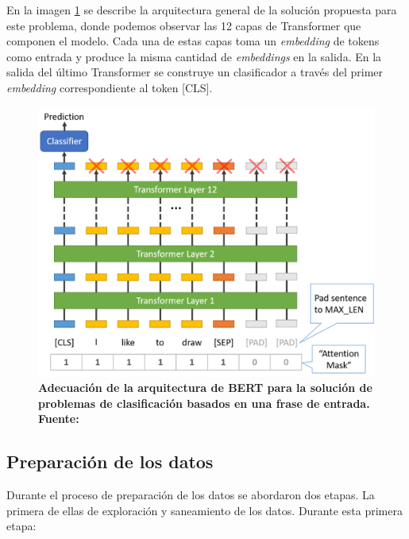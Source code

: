 En la imagen \ref{fig-bert-as-architecture} se describe la arquitectura general de la solución propuesta para este problema, donde podemos observar las 12 capas de Transformer que componen el modelo. Cada una de estas capas toma un \textit{embedding} de tokens como entrada y produce la misma cantidad de \textit{embeddings} en la salida. En la salida del último Transformer se construye un clasificador a través del primer \textit{embedding} correspondiente al token [CLS].

\begin{figure}[ht!]
    \centering
    \includegraphics[scale=0.5]{figuras/bert-as-architecture.png}
    \caption[Análisis de Sentimiento - Arquitectura de la solución]{\textbf{Adecuación de la arquitectura de BERT para la solución de problemas de clasificación basados en una frase de entrada. Fuente: \cite{chris_mccormick_and_nick_ryan_bert_2019}}}
    \label{fig-bert-as-architecture}
\end{figure}


\subsection{Preparación de los datos}
\label{as-preparacion-de-los-datos}

Durante el proceso de preparación de los datos se abordaron dos etapas. La primera de ellas de exploración y saneamiento de los datos. Durante esta primera etapa:

